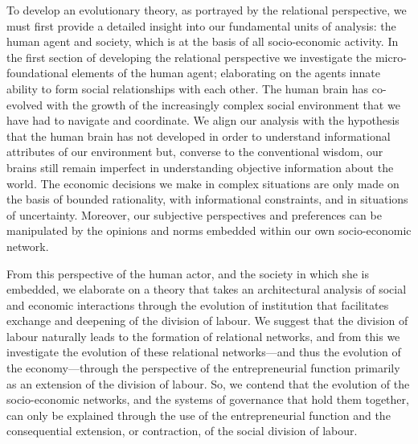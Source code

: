 
\medskip\noindent To develop an evolutionary theory, as portrayed by the relational perspective, we must first provide a detailed insight into our fundamental units of analysis: the human agent and society, which is at the basis of all socio-economic activity. In the first section of developing the relational perspective we investigate the micro-foundational elements of the human agent; elaborating on the agents innate ability to form social relationships with each other. The human brain has co-evolved with the growth of the increasingly complex social environment that we have had to navigate and coordinate. We align our analysis with the hypothesis that the human brain has not developed in order to understand informational attributes of our environment but, converse to the conventional wisdom, our brains still remain imperfect in understanding objective information about the world. The economic decisions we make in complex situations are only made on the basis of bounded rationality, with informational constraints, and in situations of uncertainty. Moreover, our subjective perspectives and preferences can be manipulated by the opinions and norms embedded within our own socio-economic network.

From this perspective of the human actor, and the society in which she is embedded, we elaborate on a theory that takes an architectural analysis of social and economic interactions through the evolution of institution that facilitates exchange and deepening of the division of labour. We suggest that the division of labour naturally leads to the formation of relational networks, and from this we investigate the evolution of these relational networks---and thus the evolution of the economy---through the perspective of the entrepreneurial function primarily as an extension of the division of labour. So, we contend that the evolution of the socio-economic networks, and the systems of governance that hold them together, can only be explained through the use of the entrepreneurial function and the consequential extension, or contraction, of the social division of labour.

